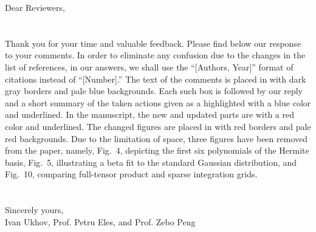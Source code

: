 Dear Reviewers,
\\
\\
\\
\noindent Thank you for your time and valuable feedback.
Please find below our response to your comments.
In order to eliminate any confusion due to the changes in the list of references, in our answers, we shall use the ``[Authors, Year]'' format of citations instead of ``[Number].''
The text of the comments is placed in  with dark gray borders and pale blue backgrounds.
Each such box is followed by our reply and a short summary of the taken actions given as a  highlighted with a blue color and underlined.
In the manuscript, the new and updated parts are  with a red color and underlined.
The changed figures are placed in  with red borders and pale red backgrounds.
Due to the limitation of space, three figures have been removed from the paper, namely, Fig.~4, depicting the first six polynomials of the Hermite basis, Fig.~5, illustrating a beta fit to the standard Gaussian distribution, and Fig.~10, comparing full-tensor product and sparse integration grids.
\\
\\
\\
\noindent Sincerely yours,\\
Ivan Ukhov, Prof. Petru Eles, and Prof. Zebo Peng
